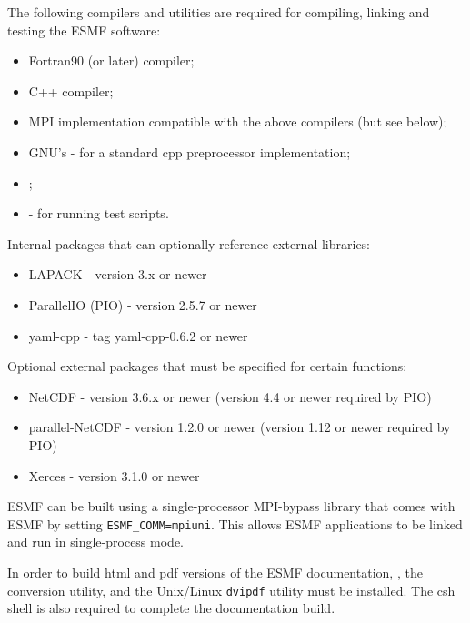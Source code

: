 

The following compilers and utilities are required for compiling, linking and
testing the ESMF software:
\begin{itemize}
\item Fortran90 (or later) compiler;
\item C++ compiler;
\item MPI implementation compatible with the above compilers (but see below);
\item GNU's  -
for a standard cpp preprocessor implementation;
\item {}; 
\item {} - for running
test scripts.
\end{itemize} 

Internal packages that can optionally reference external libraries:
\begin{itemize}
\item LAPACK - version 3.x or newer
\item ParallelIO (PIO) - version 2.5.7 or newer
\item yaml-cpp - tag yaml-cpp-0.6.2 or newer
\end{itemize}

Optional external packages that must be specified for certain functions:
\begin{itemize}
\item NetCDF - version 3.6.x or newer (version 4.4 or newer required by PIO)
\item parallel-NetCDF - version 1.2.0 or newer (version 1.12 or newer required by PIO)
\item Xerces - version 3.1.0 or newer
\end{itemize}  

ESMF can be built using a single-processor MPI-bypass library
that comes with ESMF by setting {\tt ESMF\_COMM=mpiuni}. This allows ESMF applications
to be linked and run in single-process mode.

In order to build html and pdf versions of the ESMF documentation, 
,
the 
conversion utility, and the Unix/Linux {\tt dvipdf} utility must be installed.
The csh shell is also required to complete the documentation build.
